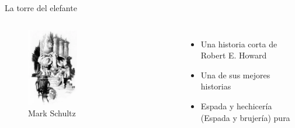 \begin{frame}{}
	\maketitle
\end{frame}
\note[itemize]{
	\item
}

\begin{frame}{La torre del elefante}
	\begin{columns}
		\begin{figure}[htb]
			\centering
			\includegraphics[width=0.4\textwidth]{img/Intro}
			\caption{Mark Schultz}
		\end{figure}
		\begin{itemize}
			\item Una historia corta de Robert E. Howard
			\item Una de sus mejores historias
			\item Espada y hechicería (Espada y brujería) pura
		\end{itemize}
	\end{columns}
\end{frame}
\note[itemize]{
	\item
}

